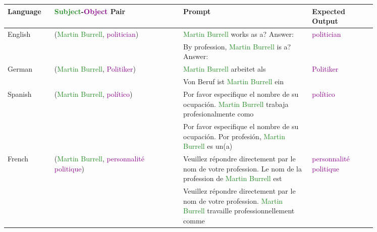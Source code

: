 \begin{table*}[htbp]
\scriptsize
\centering
\setlength{\tabcolsep}{1.0mm}{}
\begin{center}
\begin{tabular}{m{0.10\linewidth} p{0.30\linewidth} p{0.30\linewidth} m{0.15\linewidth}}
\textbf{Language} & \textbf{\textcolor{forestgreen}{Subject}-\textcolor{darkmagenta}{Object} Pair} & \textbf{Prompt} & \textbf{Expected Output} \\
\toprule
\multirow{2}{*}{\centering English} 
    & \multirow{2}{*}{\raggedright (\textcolor{forestgreen}{Martin Burrell}, \textcolor{darkmagenta}{politician})}
    & \textcolor{forestgreen}{Martin Burrell} works as a? \newline Answer:
    & \multirow{2}{*}{\centering \textcolor{darkmagenta}{politician}} \\
    & 
    & By profession, \textcolor{forestgreen}{Martin Burrell} is a? \newline Answer:
    & \\
\midrule
\multirow{2}{*}{\centering German}
    & \multirow{2}{*}{\raggedright (\textcolor{forestgreen}{Martin Burrell}, \textcolor{darkmagenta}{Politiker})}
    & \textcolor{forestgreen}{Martin Burrell} arbeitet als
    & \multirow{2}{*}{\centering \textcolor{darkmagenta}{Politiker}} \\
    & 
    & Von Beruf ist \textcolor{forestgreen}{Martin Burrell} ein
    & \\
\midrule
\multirow{2}{*}{\centering Spanish}
    & \multirow{2}{*}{\raggedright (\textcolor{forestgreen}{Martin Burrell}, \textcolor{darkmagenta}{político})}
    & Por favor especifique el nombre de su ocupación. \textcolor{forestgreen}{Martin Burrell} trabaja profesionalmente como
    & \multirow{2}{*}{\centering \textcolor{darkmagenta}{político}} \\
    & 
    & Por favor especifique el nombre de su ocupación. Por profesión, \textcolor{forestgreen}{Martin Burrell} es un(a)
    & \\
\midrule
\multirow{2}{*}{\centering French}
    & \multirow{2}{*}{\raggedright (\textcolor{forestgreen}{Martin Burrell}, \textcolor{darkmagenta}{personnalité politique})}
    & Veuillez répondre directement par le nom de votre profession. Le nom de la profession de \textcolor{forestgreen}{Martin Burrell} est
    & \multirow{2}{*}{\centering \textcolor{darkmagenta}{personnalité politique}} \\
    & 
    & Veuillez répondre directement par le nom de votre profession. \textcolor{forestgreen}{Martin Burrell} travaille professionnellement comme

\end{tabular}
\end{center}
\end{table*}
